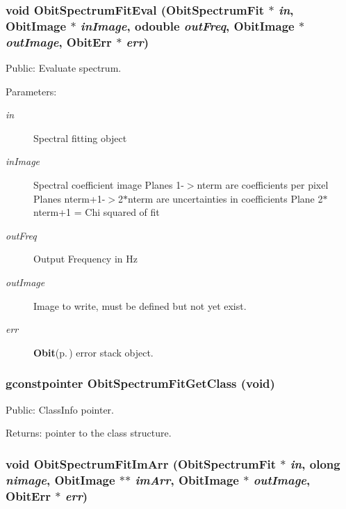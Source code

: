 \subsubsection{\setlength{\rightskip}{0pt plus 5cm}void Obit\-Spectrum\-Fit\-Eval ({\bf Obit\-Spectrum\-Fit} $\ast$ {\em in}, {\bf Obit\-Image} $\ast$ {\em in\-Image}, {\bf odouble} {\em out\-Freq}, {\bf Obit\-Image} $\ast$ {\em out\-Image}, {\bf Obit\-Err} $\ast$ {\em err})}\label{ObitSpectrumFit_8c_a18}


Public: Evaluate spectrum. 

\begin{Desc}
\item[Parameters:]
\begin{description}
\item[{\em in}]Spectral fitting object \item[{\em in\-Image}]Spectral coefficient image Planes 1-$>$nterm are coefficients per pixel Planes nterm+1-$>$2$\ast$nterm are uncertainties in coefficients Plane 2$\ast$nterm+1 = Chi squared of fit \item[{\em out\-Freq}]Output Frequency in Hz \item[{\em out\-Image}]Image to write, must be defined but not yet exist. \item[{\em err}]{\bf Obit}{\rm (p.\,\pageref{structObit})} error stack object. \end{description}
\end{Desc}
\subsubsection{\setlength{\rightskip}{0pt plus 5cm}gconstpointer Obit\-Spectrum\-Fit\-Get\-Class (void)}\label{ObitSpectrumFit_8c_a12}


Public: Class\-Info pointer. 

\begin{Desc}
\item[Returns:]pointer to the class structure. \end{Desc}
\subsubsection{\setlength{\rightskip}{0pt plus 5cm}void Obit\-Spectrum\-Fit\-Im\-Arr ({\bf Obit\-Spectrum\-Fit} $\ast$ {\em in}, {\bf olong} {\em nimage}, {\bf Obit\-Image} $\ast$$\ast$ {\em im\-Arr}, {\bf Obit\-Image} $\ast$ {\em out\-Image}, {\bf Obit\-Err} $\ast$ {\em err})}\label{ObitSpectrumFit_8c_a17}


